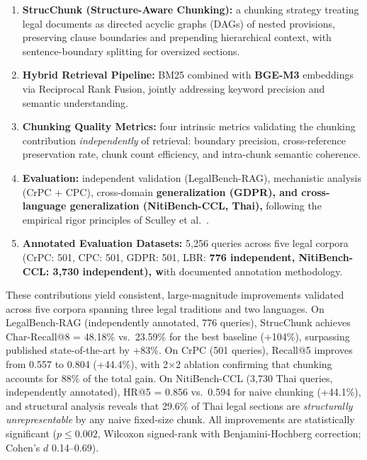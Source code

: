 \documentclass[sn-mathphys,Numbered]{sn-jnl}%
\begin{document}
\begin{enumerate}
\item \textbf{StrucChunk (Structure-Aware Chunking):} a chunking strategy
      treating legal documents as directed acyclic graphs (DAGs) of nested
      provisions, preserving clause boundaries and prepending hierarchical
      context, with sentence-boundary splitting for oversized sections.
\item \textbf{Hybrid Retrieval Pipeline:} BM25 combined with \textbf{BGE-M3}
      embeddings via Reciprocal Rank Fusion, jointly addressing keyword
      precision and semantic understanding.
\item \textbf{Chunking Quality Metrics:} four intrinsic metrics validating
      the chunking contribution \emph{independently} of retrieval: boundary
      precision, cross-reference preservation rate, chunk count efficiency,
      and intra-chunk semantic coherence.
\item \textbf{Evaluation:} independent validation
      (LegalBench-RAG), mechanistic analysis (CrPC + CPC), cross-domain
      \textbf{generalization (GDPR), and cross-language generalization
      (NitiBench-CCL, Thai), }following the empirical rigor principles of
      Sculley et al.~\cite{sculley2018winners}.
\item \textbf{Annotated Evaluation Datasets:} 5,256 queries across five
      legal corpora (CrPC: 501, CPC: 501, GDPR: 501, LBR: \textbf{776 independent,
      NitiBench-CCL: 3,730 independent), w}ith documented annotation
      methodology.
\end{enumerate}

These contributions yield consistent, large-magnitude improvements validated
across five corpora spanning three legal traditions and two languages.  On
LegalBench-RAG (independently annotated, 776 queries), StrucChunk achieves
Char-Recall@8 = 48.18\% vs.\ 23.59\% for the best baseline (+104\%),
surpassing published state-of-the-art by +83\%.  On CrPC (501 queries),
Recall@5 improves from 0.557 to 0.804 (+44.4\%), with 2$\times$2 ablation
confirming that chunking accounts for 88\% of the total gain.  On
NitiBench-CCL (3,730 Thai queries, independently annotated), HR@5 = 0.856
vs.\ 0.594 for naive chunking (+44.1\%), and structural analysis reveals
that 29.6\% of Thai legal sections are \emph{structurally unrepresentable}
by any naive fixed-size chunk.  All improvements are statistically
significant ($p \leq 0.002$, Wilcoxon signed-rank with Benjamini-Hochberg
correction; Cohen's $d$ 0.14--0.69).
\end{document}
